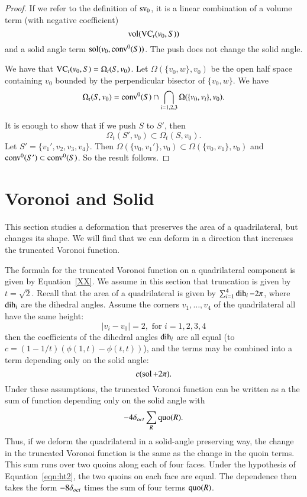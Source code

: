 \begin{proof}  If we refer to the definition of ${\operatorname{sv}}_0$, it
is a linear combination of a volume term (with negative coefficient)
   $${\operatorname{vol}}({\operatorname{VC}}_t(v_0,S))$$
and a solid angle term ${\operatorname{sol}}(v_0,{\operatorname{conv}}^0(S))$.
The push does not change the solid angle.

We have that ${\operatorname{VC}}_t(v_0,S) = \Omega_t(S,v_0)$.
Let $\Omega(\{v_0,w\},v_0)$ be the open half space
containing $v_0$ bounded by the perpendicular bisector of $\{v_0,w\}$.
We have 
$$
  \Omega_t(S,v_0) = 
  {\operatorname{conv}}^0(S) \cap \bigcap_{i=1,2,3} \Omega(\{v_0,v_i\},v_0).
$$

It is enough to show that if we push $S$ to $S'$, then
  $$
  \Omega_t(S',v_0) \subset \Omega_t(S,v_0).
  $$
Let $S'=\{v_1',v_2,v_3,v_4\}$.  Then $\Omega(\{v_0,v_1'\},v_0)\subset 
     \Omega(\{v_0,v_1\},v_0)$
and ${\operatorname{conv}}^0(S')\subset {\operatorname{conv}}^0(S)$.  So the result follows. 
\end{proof}





\section{Voronoi and Solid}

This section studies a deformation that preserves the area of a
quadrilateral, but changes its shape.  We will find that we can
deform in a direction that increases the truncated Voronoi
function.

The formula for the truncated Voronoi function on a quadrilateral
component is given by Equation~\ref{XX}.  We assume in this section
that truncation is given by $t=\sqrt2$.  Recall that the area of a
quadrilateral is given by $\sum_{i=1}^4 \operatorname{dih}_i - 2\pi$, where
$\operatorname{dih}_i$ are the dihedral angles.  Assume the corners
$v_1,\ldots,v_4$ of the quadrilateral all have the same height:
    \begin{equation}\label{eqn:ht2}
    |v_i-v_0| = 2,\text{ for } i=1,2,3,4
    \end{equation}
then the coefficients of the dihedral angles ${\operatorname{dih}}_i$ are all
equal (to $c=(1-1/t)(\phi(1,t)-\phi(t,t))$), and the terms may be
combined into a term depending only on the solid angle:
    $$c (\operatorname{sol} + 2\pi).$$
Under these assumptions, the truncated Voronoi function can be
written as a the sum of function depending only on the solid angle
with
    $$
    -4 \delta_{oct} \sum_R \operatorname{quo}(R).
    $$
Thus, if we deform the quadrilateral in a solid-angle preserving
way, the change in the truncated Voronoi function is the same as
the change in the quoin terms.  This sum runs over two quoins
along each of four faces.  Under the hypothesis of
Equation~\ref{eqn:ht2}, the two quoins on each face are equal. The
dependence then takes the form $-8\delta_{oct}$ times the sum of four
terms $\operatorname{quo}(R)$.


